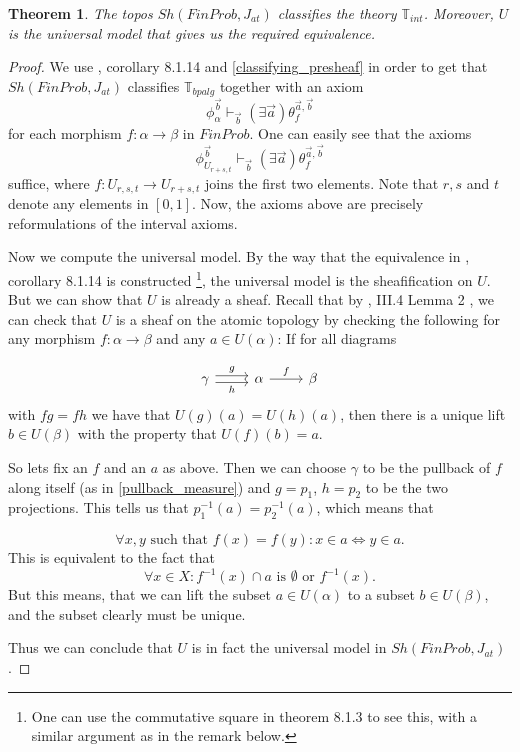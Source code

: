\documentclass[a4paper]{amsproc}
\theoremstyle{plain}
\newtheorem{theorem}{Theorem}[section]
\theoremstyle{definition}
\theoremstyle{remark}
\numberwithin{equation}{section}
\begin{document}
\begin{theorem} \label{classifying}
The topos $Sh(FinProb,J_{at})$ classifies the theory $\mathbb{T}_{int}$. Moreover, $U$ is the universal model that gives us the required equivalence.
\end{theorem}
\begin{proof}
We use \cite{caramello_book}, corollary 8.1.14 and \ref{classifying_presheaf} in order to get that $Sh(FinProb,J_{at})$ classifies $\mathbb{T}_{bpalg}$ together with an axiom
\[
\phi_{\alpha}^{\vec{b}} \vdash_{\vec{b}} (\exists \vec{a}) \theta_f^{\vec{a},\vec{b}}
\]
for each morphism $f: \alpha \to \beta$ in $FinProb$. One can easily see that the axioms
\[
\phi_{U_{r+s,t}}^{\vec{b}} \vdash_{\vec{b}} (\exists \vec{a}) \theta_f^{\vec{a},\vec{b}}
\]
suffice, where $f: U_{r,s,t} \to U_{r+s,t}$ joins the first two elements. Note that $r,s$ and $t$ denote any elements in $[0,1]$. Now, the axioms above are precisely reformulations of the interval axioms.

Now we compute the universal model. By the way that the equivalence in \cite{caramello_book}, corollary 8.1.14 is constructed \footnote{One can use the commutative square in theorem 8.1.3 to see this, with a similar argument as in the remark below.}, the universal model is the sheafification on $U$. But we can show that $U$ is already a sheaf. Recall that by \cite{sheaves_geometry_logic}, III.4 Lemma 2 , we can check that $U$ is a sheaf on the atomic topology by checking the following for any morphism $f: \alpha \to \beta$ and any $a \in U(\alpha)$: If for all diagrams

\[
\begin{tikzcd}
\gamma \arrow[r, "g", shift left] \arrow[r, "h"', shift right] & \alpha \arrow[r, "f"] & \beta
\end{tikzcd}
\]
with $f g = f h$ we have that $U(g)(a) = U(h)(a)$, then there is a unique lift $b \in U(\beta)$ with the property that $U(f)(b) = a$.

So lets fix an $f$ and an $a$ as above. Then we can choose $\gamma$ to be the pullback of $f$ along itself (as in \ref{pullback_measure}) and $g = p_1$, $h = p_2$ to be the two projections. This tells us that $p_1^{-1}(a) = p_2^{-1}(a)$, which means that

\[
\forall x,y \text{ such that } f(x) = f(y): x \in a \Leftrightarrow y \in a .
\]
This is equivalent to the fact that
\[
\forall x \in X: f^{-1}(x) \cap a \text{ is } \emptyset \text{ or } f^{-1}(x) .
\]
But this means, that we can lift the subset $a \in U(\alpha)$ to a subset $b \in U(\beta)$, and the subset clearly must be unique.

Thus we can conclude that $U$ is in fact the universal model in $Sh(FinProb, J_{at})$.
\end{proof}
\end{document}
